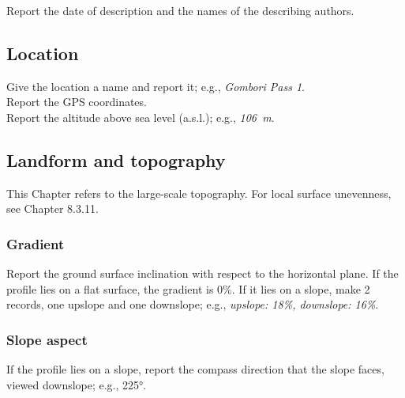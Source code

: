 \documentclass[
  letterpaper,
  DIV=11,
  numbers=noendperiod]{scrreprt}
\begin{document}
Report the date of description and the names of the describing authors.

\hypertarget{location}{%
\subsection{Location}\label{location}}

Give the location a name and report it; e.g., \emph{Gombori Pass 1}.\\
Report the GPS coordinates.\\
Report the altitude above sea level (a.s.l.); e.g., \emph{106~m}.

\hypertarget{landform-and-topography}{%
\subsection{Landform and topography}\label{landform-and-topography}}

This Chapter refers to the large-scale topography. For local surface
unevenness, see Chapter 8.3.11.

\hypertarget{gradient}{%
\subsubsection{Gradient}\label{gradient}}

Report the ground surface inclination with respect to the horizontal
plane. If the profile lies on a flat surface, the gradient is 0\%. If it
lies on a slope, make 2 records, one upslope and one downslope; e.g.,
\emph{upslope: 18\%, downslope: 16\%}.

\hypertarget{slope-aspect}{%
\subsubsection{Slope aspect}\label{slope-aspect}}

If the profile lies on a slope, report the compass direction that the
slope faces, viewed downslope; e.g., 225°.
\end{document}
